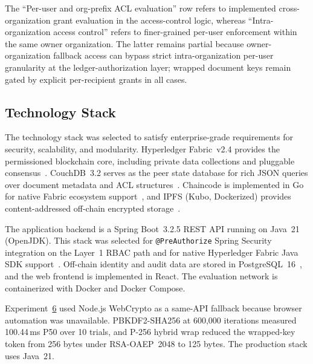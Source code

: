 \documentclass[preprint,12pt]{elsarticle}
\begin{document}
\par\vspace{3pt}
\begin{minipage}{\textwidth}
\raggedright\scriptsize
\smallskip
The ``Per-user and org-prefix ACL evaluation'' row refers to implemented
cross-organization grant evaluation in the access-control logic, whereas
``Intra-organization access control'' refers to finer-grained per-user
enforcement within the same owner organization. The latter remains partial
because owner-organization fallback access can bypass strict
intra-organization per-user granularity at the ledger-authorization
layer; wrapped document keys remain gated by explicit per-recipient
grants in all cases.
\end{minipage}
\endgroup




\subsection{Technology Stack}
\label{sec:stack}

The technology stack was selected to satisfy enterprise-grade requirements
for security, scalability, and modularity. Hyperledger Fabric~v2.4 provides
the permissioned blockchain core, including private data collections and
pluggable consensus~\cite{androulaki2018hyperledger}. CouchDB~3.2 serves as
the peer state database for rich JSON queries over document metadata and ACL
structures~\cite{fabricCouchDBStateDB_v24}. Chaincode is implemented in Go
for native Fabric ecosystem support~\cite{fabricChaincodeLifecycleDoc}, and
IPFS (Kubo, Dockerized) provides content-addressed off-chain encrypted
storage~\cite{benet2014ipfs}.

The application backend is a Spring Boot~3.2.5 REST API running on
Java~21 (OpenJDK). This stack was selected for
\texttt{@PreAuthorize} Spring Security integration on the Layer~1 RBAC path
and for native Hyperledger Fabric Java SDK support~\cite{springBoot325}.
Off-chain identity and audit data are stored in PostgreSQL~16~\cite{postgresqlTriggers},
and the web frontend is implemented in React. The evaluation network is
containerized with Docker and Docker Compose.

Experiment~\hyperref[sec:exp_crypto]{6} used Node.js WebCrypto as a same-API fallback because browser
automation was unavailable. PBKDF2-SHA256 at 600,000 iterations measured
100.44\,ms P50 over 10 trials, and P-256 hybrid wrap reduced the wrapped-key
token from 256 bytes under RSA-OAEP~2048 to 125 bytes. The production stack
uses Java~21.
\end{document}
